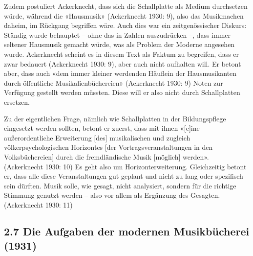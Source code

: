 \documentclass[a4paper,
fontsize=11pt,
oneside,
numbers=noperiodatend,
parskip=half-,
bibliography=totoc,
final
]{scrartcl}
\begin{document}
Zudem postuliert Ackerknecht, dass sich die Schallplatte als Medium
durchsetzen würde, während die «Hausmusik» (Ackerknecht 1930: 9), also
das Musikmachen daheim, im Rückgang begriffen wäre. Auch dies war ein
zeitgenössischer Diskurs: Ständig wurde behauptet -- ohne das in Zahlen
auszudrücken --, dass immer seltener Hausmusik gemacht würde, was als
Problem der Moderne angesehen wurde. Ackerknecht scheint es in diesem
Text als Faktum zu begreifen, dass er zwar bedauert (Ackerknecht 1930:
9), aber auch nicht aufhalten will. Er betont aber, dass auch «dem immer
kleiner werdenden Häuflein der Hausmusikanten durch öffentliche
Musikalienbüchereien» (Ackerknecht 1930: 9) Noten zur Verfügung gestellt
werden müssten. Diese will er also nicht durch Schallplatten ersetzen.

Zu der eigentlichen Frage, nämlich wie Schallplatten in der
Bildungspflege eingesetzt werden sollten, betont er zuerst, dass mit
ihnen «{[}e{]}ine außerordentliche Erweiterung {[}des{]} musikalischen
und zugleich völkerpsychologischen Horizontes {[}der
Vortragsveranstaltungen in den Volksbüchereien{]} durch die
fremdländische Musik {[}möglich{]} werden». (Ackerknecht 1930: 10) Es
geht also um Horizonterweiterung. Gleichzeitig betont er, dass alle
diese Veranstaltungen gut geplant und nicht zu lang oder spezifisch sein
dürften. Musik solle, wie gesagt, nicht analysiert, sondern für die
richtige Stimmung genutzt werden -- also vor allem als Ergänzung des
Gesagten. (Ackerknecht 1930: 11)

\hypertarget{die-aufgaben-der-modernen-musikbuxfccherei-1931}{%
\subsection{2.7 Die Aufgaben der modernen Musikbücherei
(1931)}\label{die-aufgaben-der-modernen-musikbuxfccherei-1931}}
\end{document}
